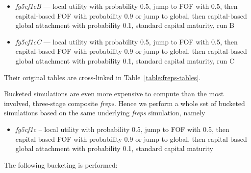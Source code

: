 \documentclass[10pt,oneside]{memoir}
\begin{document}
\begin{itemize}
\item {\itshape fg5cf1cB} --- local utility with probability 0.5, jump to FOF with 0.5, then capital-based FOF with probability 0.9 or jump to global, then capital-based global attachment with probability 0.1, standard capital maturity, run B

\item {\itshape fg5cf1cC} --- local utility with probability 0.5, jump to FOF with 0.5, then capital-based FOF with probability 0.9 or jump to global, then capital-based global attachment with probability 0.1, standard capital maturity, run C
\end{itemize}

Their original tables are cross-linked in Table~\ref{table:freps-tables}.


Bucketed simulations are even more expensive to compute than the most involved, three-stage composite {\itshape freps}.  Hence we perform a whole set of bucketed simulations based on the same underlying {\itshape freps} simulation, namely 


\begin{itemize}


\item {\itshape fg5cf1c} -- local utility with probability 0.5, jump to FOF with 0.5, then capital-based FOF with probability 0.9 or jump to global, then capital-based global attachment with probability 0.1, standard capital maturity
\end{itemize}

The following bucketing is performed:
\end{document}
